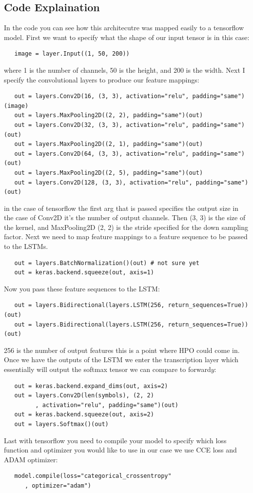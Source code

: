 \documentclass[11pt]{article}
\begin{document}
\subsection{Code Explaination}
In the code you can see how this architecutre was mapped easily to a tensorflow model. First we want to specify what the shape of our input tensor is in this case:
\begin{verbatim}
   image = layer.Input((1, 50, 200))
\end{verbatim}
where 1 is the number of channels, 50 is the height, and 200 is the width. Next I specify the convolutional layers to produce our feature mappings:
\begin{verbatim}
   out = layers.Conv2D(16, (3, 3), activation="relu", padding="same")(image)
   out = layers.MaxPooling2D((2, 2), padding="same")(out)
   out = layers.Conv2D(32, (3, 3), activation="relu", padding="same")(out)
   out = layers.MaxPooling2D((2, 1), padding="same")(out)
   out = layers.Conv2D(64, (3, 3), activation="relu", padding="same")(out)
   out = layers.MaxPooling2D((2, 5), padding="same")(out)
   out = layers.Conv2D(128, (3, 3), activation="relu", padding="same")(out)
\end{verbatim}
in the case of tensorflow the first arg that is passed specifies the output size in the case of Conv2D it's the number of output channels. Then (3, 3) is the size of the kernel, and MaxPooling2D (2, 2) is the stride specified for the down sampling factor. Next we need to map feature mappings to a feature sequence to be passed to the LSTMs.
\begin{verbatim}
   out = layers.BatchNormalization()(out) # not sure yet
   out = keras.backend.squeeze(out, axis=1)
\end{verbatim}
Now you pass these feature sequences to the LSTM:
\begin{verbatim}
   out = layers.Bidirectional(layers.LSTM(256, return_sequences=True))(out)
   out = layers.Bidirectional(layers.LSTM(256, return_sequences=True))(out) 
\end{verbatim}
256 is the number of output features this is a point where HPO could come in. Once we have the outputs of the LSTM we enter the transcription layer which essentially will output the softmax tensor we can compare to forward\(y\):
\begin{verbatim}
   out = keras.backend.expand_dims(out, axis=2)
   out = layers.Conv2D(len(symbols), (2, 2)
         , activation="relu", padding="same")(out)
   out = keras.backend.squeeze(out, axis=2)
   out = layers.Softmax()(out)
\end{verbatim}
Last with tensorflow you need to compile your model to specify which loss function and optimizer you would like to use in our case we use CCE loss and ADAM optimizer:
\begin{verbatim}
   model.compile(loss="categorical_crossentropy"
      , optimizer="adam")
\end{verbatim}
\end{document}
